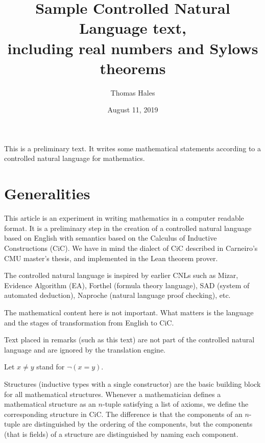 \documentclass[12pt]{article}
\title{Sample Controlled Natural Language text,\\ including real numbers and Sylows theorems}
\date{August 11, 2019}
\author{Thomas Hales}
\begin{document}
\maketitle


\begin{cnl}

\begin{remark}
This is a preliminary text.  It
writes some mathematical statements according to a
controlled natural language for mathematics.
\end{remark}


\section{Generalities}

\begin{remark}
This article is an experiment in writing mathematics in a computer
readable format.  It is a preliminary step in the creation of a
controlled natural language based on English with semantics based on
the Calculus of Inductive Constructions (CiC).  We have in mind the
dialect of CiC described in Carneiro's CMU master's thesis, and
implemented in the Lean theorem prover.

The controlled natural language is inspired by earlier CNLs such as
Mizar, Evidence Algorithm (EA), Forthel (formula theory language), SAD
(system of automated deduction), Naproche (natural language proof
checking), etc.

The mathematical content here is not important.  What matters is the
language and the stages of transformation from English to CiC.

Text placed in remarks (such as this text) are not part of the
controlled natural language and are ignored by the translation engine.
\end{remark}


Let $x \ne y$ stand for $\neg(x = y)$.

\begin{remark}
Structures (inductive types with a single constructor) are the basic
building block for all mathematical structures. Whenever a
mathematician defines a mathematical structure as an $n$-tuple
satisfying a list of axioms, we define the corresponding
structure in CiC. The difference is that the components of an
$n$-tuple are distinguished by the ordering of the components, but the
components (that is fields) of a structure are distinguished by naming
each component.


\end{remark}
\end{cnl}
\end{document}
